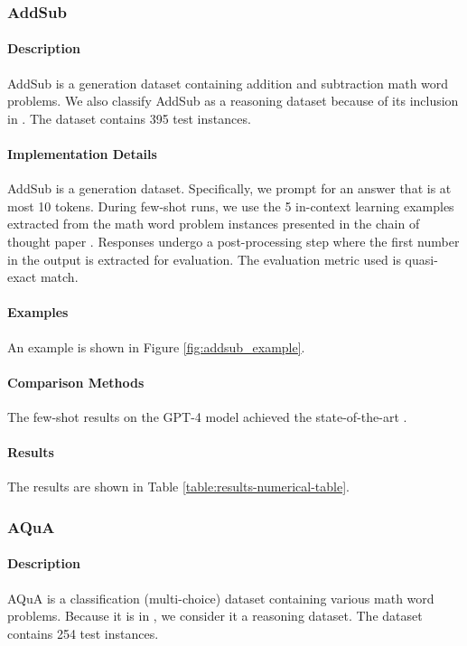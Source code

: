 \subsubsection{AddSub} 
\paragraph{Description} AddSub \citep{koncel-kedziorski-etal-2016-mawps} is a generation dataset containing addition and subtraction math word problems. We also classify AddSub as a reasoning dataset because of its inclusion in \citet{kojima2023large}. The dataset contains 395 test instances. 

\paragraph{Implementation Details} 
AddSub is a generation dataset. Specifically, we prompt for an answer that is at most 10 tokens. During few-shot runs, we use the 5 in-context learning examples extracted from the math word problem instances presented in the chain of thought paper \citep{wei2023chainofthought}. Responses undergo a post-processing step where the first number in the output is extracted for evaluation. The evaluation metric used is quasi-exact match.


\paragraph{Examples} An example is shown in Figure \ref{fig:addsub_example}.

\paragraph{Comparison Methods}
The few-shot results on the GPT-4 model achieved the state-of-the-art \citep{zhao2023automatic}.

\paragraph{Results} The results are shown in Table \ref{table:results-numerical-table}.

\subsubsection{AQuA}
\paragraph{Description} AQuA \citep{ling2017program} is a classification (multi-choice) dataset containing various math word problems. Because it is in \citet{kojima2023large}, we consider it a reasoning dataset. The dataset contains 254 test instances.

